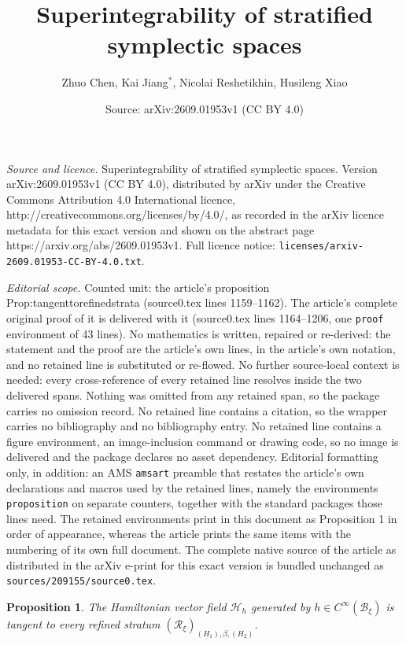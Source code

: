 \documentclass[10pt,a4paper]{amsart}
\title{Superintegrability of stratified symplectic spaces}
\author{Zhuo Chen, Kai Jiang$^*$, Nicolai Reshetikhin, Husileng Xiao}
\date{Source: arXiv:2609.01953v1 (CC BY 4.0)}
\newtheorem{proposition}{Proposition}
\newcommand{\Bxi}{\mathcal{B}_{\xi}}
\newcommand{\Cinf}{C^\infty}
\newcommand{\Hamiltonian}[1]{\mathcal{H}_{#1}}
\newcommand{\Reducedxi}{\mathcal{R}_\xi}
\begin{document}
\maketitle

\noindent\emph{Source and licence.} Superintegrability of stratified symplectic spaces. Version arXiv:2609.01953v1 (CC BY 4.0), distributed by arXiv under the Creative Commons Attribution 4.0 International licence, http://creativecommons.org/licenses/by/4.0/, as recorded in the arXiv licence metadata for this exact version and shown on the abstract page https://arxiv.org/abs/2609.01953v1. Full licence notice: \texttt{licenses/arxiv-2609.01953-CC-BY-4.0.txt}.\par\smallskip

\noindent\textit{Editorial scope.} Counted unit: the article's proposition Prop:tangenttorefinedstrata (source0.tex lines 1159--1162). The article's complete original proof of it is delivered with it (source0.tex lines 1164--1206, one \texttt{proof} environment of 43 lines). No mathematics is written, repaired or re-derived: the statement and the proof are the article's own lines, in the article's own notation, and no retained line is substituted or re-flowed.  No further source-local context is needed: every cross-reference of every retained line resolves inside the two delivered spans.  Nothing was omitted from any retained span, so the package carries no omission record.  No retained line contains a citation, so the wrapper carries no bibliography and no bibliography entry.  No retained line contains a figure environment, an image-inclusion command or drawing code, so no image is delivered and the package declares no asset dependency.  Editorial formatting only, in addition: an AMS \texttt{amsart} preamble that restates the article's own declarations and macros used by the retained lines, namely the environments \texttt{proposition} on separate counters, together with the standard packages those lines need.  The retained environments print in this document as Proposition 1 in order of appearance, whereas the article prints the same items with the numbering of its own full document.  The complete native source of the article as distributed in the arXiv e-print for this exact version is bundled unchanged as \texttt{sources/209155/source0.tex}.
\begin{proposition}\label{Prop:tangenttorefinedstrata}
  The Hamiltonian vector field $\Hamiltonian{h}$ generated by $h \in \Cinf(\Bxi)$ is tangent to every refined stratum $(\Reducedxi)_{(H_1),\beta,(H_2)}$.

\end{proposition} 
\end{document}
